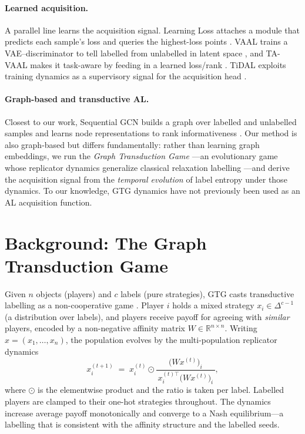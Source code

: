 \documentclass[11pt]{article}
\begin{document}
\paragraph{Learned acquisition.} A parallel line learns the acquisition signal.
Learning Loss attaches a module that predicts each sample's loss and queries the
highest-loss points \citep{yoo2019learning}. VAAL trains a VAE--discriminator to
tell labelled from unlabelled in latent space \citep{sinha2019variational}, and
TA-VAAL makes it task-aware by feeding in a learned loss/rank
\citep{kim2021task}. TiDAL exploits training dynamics as a supervisory signal for
the acquisition head \citep{kye2023tidal}.

\paragraph{Graph-based and transductive AL.} Closest to our work, Sequential GCN
builds a graph over labelled and unlabelled samples and learns node
representations to rank informativeness \citep{caramalau2021sequential}. Our method
is also graph-based but differs fundamentally: rather than learning graph
embeddings, we run the \emph{Graph Transduction Game}
\citep{erdem2012graph}---an evolutionary game whose replicator dynamics generalize
classical relaxation labelling \citep{pelillo1997dynamics}---and derive the
acquisition signal from the \emph{temporal evolution} of label entropy under those
dynamics. To our knowledge, GTG dynamics have not previously been used as an AL
acquisition function.

\section{Background: The Graph Transduction Game}

Given $n$ objects (players) and $c$ labels (pure strategies), GTG casts
transductive labelling as a non-cooperative game \citep{erdem2012graph}. Player
$i$ holds a mixed strategy $x_i \in \Delta^{c-1}$ (a distribution over labels),
and players receive payoff for agreeing with \emph{similar} players, encoded by a
non-negative affinity matrix $W \in \mathbb{R}^{n\times n}$. Writing
$x=(x_1,\dots,x_n)$, the population evolves by the multi-population replicator
dynamics
\begin{equation}
  x_{i}^{(t+1)} \;=\; x_{i}^{(t)} \odot
  \frac{\big(W x^{(t)}\big)_{i}}{\,x_{i}^{(t)\top}\big(W x^{(t)}\big)_{i}\,},
  \label{eq:replicator}
\end{equation}
where $\odot$ is the elementwise product and the ratio is taken per label. Labelled
players are clamped to their one-hot strategies throughout. The dynamics increase
average payoff monotonically and converge to a Nash equilibrium---a labelling that
is consistent with the affinity structure and the labelled seeds.
\end{document}
